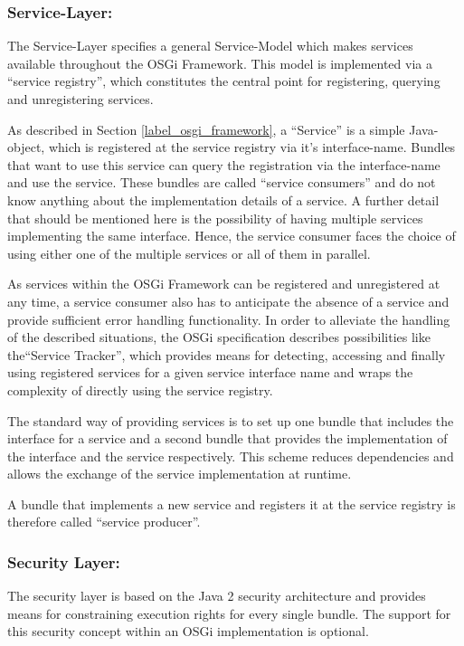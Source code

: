 \subsubsection{Service-Layer:}
\label{sec:service_layer}
The Service-Layer specifies a general Service-Model which makes services
available throughout the OSGi Framework. This model is implemented via a ``service
registry'', which constitutes the central point for registering, querying and
unregistering services.

As described in Section \ref{label_osgi_framework}, a ``Service'' is a simple
Java-object, which is registered at the service registry via it's interface-name.
Bundles that want to use this service can query the registration via the
interface-name and use the service. These bundles are called ``service consumers''
and do not know anything about the implementation details of a service. A
further detail that should be mentioned here is the possibility of having
multiple services implementing the same interface. Hence, the service consumer faces the
choice of using either one of the multiple services or all of them in parallel.

As services within the OSGi Framework can be registered and unregistered at any
time, a service consumer also has to anticipate the absence of a service and
provide sufficient error handling functionality. In order to alleviate the
handling of the described situations, the OSGi specification describes
possibilities like the``Service Tracker'', which provides means for detecting,
accessing and finally using registered services for a given service interface
name and wraps the complexity of directly using the service registry. 

The standard way of providing services is to set up one bundle that includes the
interface for a service and a second bundle that provides the implementation of
the interface and the service respectively. This scheme reduces dependencies and
allows the exchange of the service implementation at runtime.

A bundle that implements a new service and registers it at the service registry
is therefore called ``service producer''.

\subsubsection{Security Layer:}
The security layer is based on the Java 2 security architecture and provides
means for constraining execution rights for every single bundle. The support
for this security concept within an OSGi implementation is optional.

